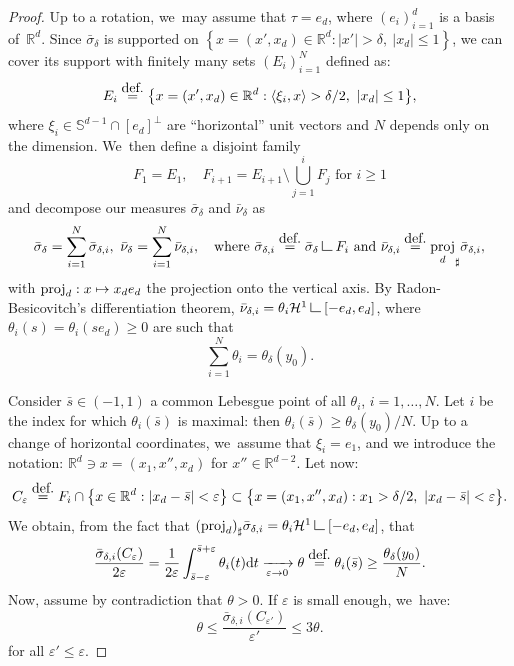 \documentclass[11pt]{article}
\numberwithin{equation}{section}
\newcommand\mto{\mathchoice{\longmapsto}{\mapsto}{\mapsto}{\mapsto}}
\theoremstyle{definition}
\newcommand{\eqdef}{\ensuremath{\stackrel{\mbox{\upshape\tiny def.}}{=}}}
\newcommand{\inner}[1]{\left\langle#1\right\rangle}
\newcommand\LM[1]{\hbox{\vrule width.5pt \vbox to#1pt{\vfill \hrule width#1pt height.5pt}}}
\newcommand\LL{{\mathchoice {\>\LM7\>}{\>\LM7\>}{\,\LM5\,}{\,\LM{3.35}\,}}}
\newcommand{\mres}{\LL}
\newcommand\cH{\mathcal{H}}
\newcommand{\RR}{\mathbb{R}}
\DeclareMathOperator{\proj}{proj}
\newcommand\dd{\mathrm{d}}
\begin{document}
\begin{proof}
Up to a rotation, we~may assume that $\tau = e_d$, where $(e_i)_{i = 1}^d$ is a basis of~${\RR}^d$.
Since $\bar \sigma_{\delta}$ is supported on $\left\{x = (x',x_d) \in {\RR}^d : |x'|>\delta,\ |x_d|\le 1 \right\}$,
we can cover its support with finitely many sets
$(E_i)_{i=1}^N$ defined as:
\[
E_i
\eqdef
\bigl\{
x = (x',x_d) \in {\RR}^d :
\inner{\xi_i, x} > \delta/2,
\ |x_d| \le 1
\bigr\},
\]
where $\xi_i \in \mathbb{S}^{d-1} \cap [e_d]^\perp$ are ``horizontal'' unit
vectors and $N$ depends only on the dimension. We~then define a disjoint family
\[
F_1 = E_1, \quad F_{i+1} = E_{i+1}\setminus \bigcup_{j=1}^i F_j \text{ for $i\ge 1$}
\]
and decompose our measures $\bar \sigma_{\delta}$ and $\bar \nu_{\delta}$ as
\[
\bar \sigma_{\delta} = \sum_{i = 1}^N \bar \sigma_{\delta, i}, \
\bar \nu_{\delta} = \sum_{i = 1}^N \bar \nu_{\delta, i},\quad
\text{where }
\bar \sigma_{\delta, i} \eqdef \bar \sigma_{\delta} \mres F_i
\text{ and }
\bar \nu_{\delta, i} \eqdef {\proj_d}_\sharp\bar \sigma_{\delta, i},
\]
with $\proj_d : x\mto x_d e_d$ the projection onto the vertical axis.
By Radon-Be\-si\-co\-vitch's differentiation theorem, $\bar \nu_{\delta, i} = \theta_i \cH^1\mres[-e_d, e_d]$, where $\theta_i(s) = \theta_i(s e_d)\ge 0$ are such that
\[
\sum_{i = 1}^N \theta_i = \theta_\delta(y_0).
\]

Consider $\bar s\in (-1,1)$ a common Lebesgue point of all $\theta_i$,
$i=1,\dots, N$. Let $i$ be the index for which $\theta_i(\bar s)$ is maximal: then $\theta_i(\bar s) \ge \theta_\delta(y_0)/N$. Up to a change of horizontal coordinates, we~assume that $\xi_i = e_1$,
and we introduce the notation: $\RR^d \ni x = (x_1, x'', x_d)$ for $x'' \in \RR^{d-2}$.
Let now:
\begin{equation*}
C_{\varepsilon}
\eqdef
F_i \cap \bigl\{ x \in\RR^d : |x_d- \bar s|<\varepsilon \bigr\}
\subset \bigl\{
x = (x_1, x'', x_d) :
x_1 > \delta/2,
\ |x_d - \bar s| < \varepsilon
\bigr\}.
\end{equation*}
We obtain, from the fact that ${(\proj_d)}_\sharp \bar \sigma_{\delta, i} = \theta_i\cH^1\mres [-e_d,e_d]$, that
\[
\frac{\bar \sigma_{\delta, i}(C_\varepsilon)}{2\varepsilon} =
\frac{1}{2\varepsilon} \int_{\bar s-\varepsilon}^{\bar s+\varepsilon}\theta_i(t)\dd t
\xrightarrow[\varepsilon \to 0]{}
\theta \eqdef \theta_i(\bar s) \ge \frac{\theta_\delta(y_0)}{N}.
\]
Now, assume by contradiction that $\theta>0$. If $\varepsilon$ is small enough, we~have:
\begin{equation}\label{eq.condition_t}
\theta
\le
\frac{\bar \sigma_{\delta, i}(C_{\varepsilon'})}{\varepsilon'}
\le
3\theta.
\end{equation}
for all $\varepsilon'\le \varepsilon$.


\end{proof}
\end{document}
